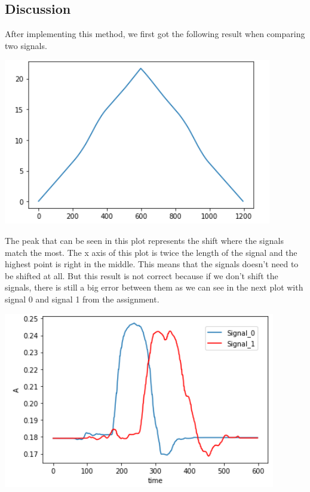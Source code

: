 \documentclass[11pt,a4paper]{article}
\begin{document}
\subsection{Discussion}
After implementing this method, we first got the following result when comparing two signals.\\
\begin{center}
\includegraphics[scale=0.8]{images/task3_1.PNG} \\
\end{center}
The peak that can be seen in this plot represents the shift where the signals match the most. The x axis of this plot is twice the length of the signal and the highest point is right in the middle. This means that the signals doesn't need to be shifted at all. But this result is not correct because if we don't shift the signals, there is still a big error between them as we can see in the next plot with signal 0 and signal 1 from the assignment.\\


\begin{center}
\includegraphics[scale=1.0]{images/task2_2.PNG} \\
\end{center}
\end{document}
